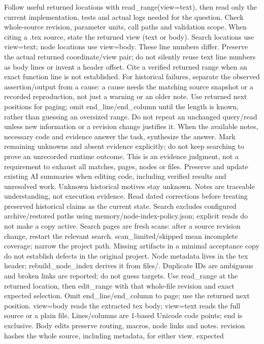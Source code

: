 Follow useful returned locations with read_range(view=text), then read only the
current implementation, tests and actual logs needed for the question. Check
whole-source revision, parameter units, call paths and validation scope.
When citing a .tex source, state the returned view (text or body). Search locations
use view=text; node locations use view=body. These line numbers differ. Preserve
the actual returned coordinate/view pair; do not silently reuse text line numbers
as body lines or invent a header offset. Cite a verified returned range when an
exact function line is not established. For historical failures, separate the
observed assertion/output from a cause: a cause needs the matching source snapshot
or a recorded reproduction, not just a warning or an older note.
Use returned next positions for paging; omit end_line/end_column until the
length is known, rather than guessing an oversized range. Do not repeat an
unchanged query/read unless new information or a revision change justifies it.
When the available notes, necessary code and evidence answer the task, synthesize
the answer. Mark remaining unknowns and absent evidence explicitly; do not keep
searching to prove an unrecorded runtime outcome. This is an evidence judgment,
not a requirement to exhaust all matches, pages, nodes or files.
Preserve and update existing AI summaries when editing code, including verified
results and unresolved work. Unknown historical motives stay unknown. Notes
are traceable understanding, not execution evidence. Read dated corrections
before treating preserved historical claims as the current state.
Search excludes configured archive/restored paths using memory/node-index-policy.json;
explicit reads do not make a copy active. Search pages are fresh scans: after a
source revision change, restart the relevant search. scan_limited/skipped mean
incomplete coverage; narrow the project path. Missing artifacts in a minimal
acceptance copy do not establish defects in the original project.
Node metadata lives in the tex header; rebuild_node_index derives it from files/.
Duplicate IDs are ambiguous and broken links are reported; do not guess targets.
Use read_range at the returned location, then edit_range with that whole-file
revision and exact expected selection. Omit end_line/end_column to page; use the
returned next position. view=body reads the extracted tex body; view=text reads
the full source or a plain file. Lines/columns are 1-based Unicode code points;
end is exclusive. Body edits preserve routing, macros, node links and notes.
revision hashes the whole source, including metadata, for either view. expected
